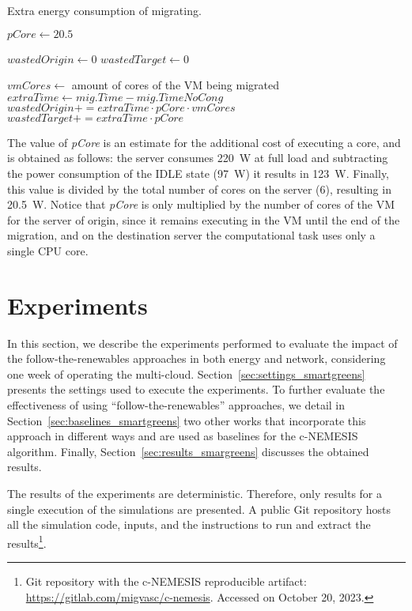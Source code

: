 \begin{algorithm}[h]
\begin{algorithmic}
\caption{Extra energy consumption of migrating.}\label{alg:wasted_energy}

\State $pCore \gets 20.5$

\State $wastedOrigin \gets 0$
\State $wastedTarget \gets 0$

    \State $vmCores \gets$ amount of cores of the VM being migrated
    \State $extraTime \gets mig.Time - mig.TimeNoCong$
        \State $wastedOrigin += extraTime \cdot pCore \cdot vmCores$ 
        \State $wastedTarget += extraTime \cdot pCore$ 
    \EndIf
\EndFor
\end{algorithmic}
\end{algorithm}

The value of \textit{pCore} is an estimate for the additional cost of executing a core, and is obtained as follows: the server consumes \SI{220}{\watt} at full load and subtracting the power consumption of the IDLE state (\SI{97}{\watt}) it results in \SI{123}{\watt}. Finally, this value is divided by the total number of cores on the server (6), resulting in \SI{20.5}{\watt}. Notice that \textit{pCore} is only multiplied by the number of cores of the VM for the server of origin, since it remains executing in the VM until the end of the migration, and on the destination server the computational task uses only a single CPU core.

\section{Experiments}

\label{sec:simulations_smargreens}

In this section, we describe the experiments performed to evaluate the impact of the follow-the-renewables approaches in both energy and network, considering one week of operating the multi-cloud. Section~\ref{sec:settings_smartgreens} presents the settings used to execute the experiments. To further evaluate the effectiveness of using ``follow-the-renewables'' approaches, we detail in Section~\ref{sec:baselines_smartgreens} two other works that incorporate this approach in different ways and are used as baselines for the c-NEMESIS algorithm. Finally, Section~\ref{sec:results_smargreens} discusses the obtained results. 
 
 The results of the experiments are deterministic. Therefore, only results for a single execution of the simulations are presented. A public Git repository hosts all the simulation code, inputs, and the instructions to run and extract the results\footnote{Git repository with the c-NEMESIS reproducible artifact: \url{https://gitlab.com/migvasc/c-nemesis}. Accessed on October 20, 2023.}. 


